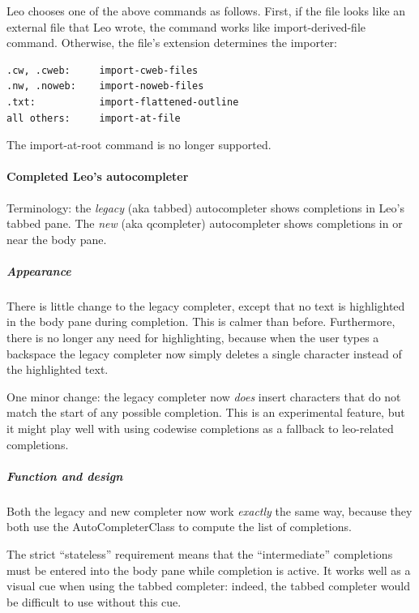 \documentclass[a4paper,10pt,english]{sphinxmanual}
\begin{document}
\begin{itemize}
Leo chooses one of the above commands as follows.  First, if the file looks
like an external file that Leo wrote, the command works like
import-derived-file command.  Otherwise, the file's extension determines the
importer:

\begin{Verbatim}[commandchars=\\\{\}]
.cw, .cweb:     import-cweb-files
.nw, .noweb:    import-noweb-files
.txt:           import-flattened-outline
all others:     import-at-file
\end{Verbatim}

The import-at-root command is no longer supported.

\end{itemize}


\paragraph{Completed Leo's autocompleter}
\label{what-is-new:completed-leo-s-autocompleter}
Terminology: the \emph{legacy} (aka tabbed) autocompleter shows completions in Leo's
tabbed pane. The \emph{new} (aka qcompleter) autocompleter shows completions in or
near the body pane.


\subparagraph{Appearance}
\label{what-is-new:appearance}
There is little change to the legacy completer, except that no text is
highlighted in the body pane during completion. This is calmer than before.
Furthermore, there is no longer any need for highlighting, because when the user
types a backspace the legacy completer now simply deletes a single character
instead of the highlighted text.

One minor change: the legacy completer now \emph{does} insert characters that do
not match the start of any possible completion. This is an experimental feature,
but it might play well with using codewise completions as a fallback to
leo-related completions.


\subparagraph{Function and design}
\label{what-is-new:function-and-design}
Both the legacy and new completer now work \emph{exactly} the same way, because they
both use the AutoCompleterClass to compute the list of completions.

The strict ``stateless'' requirement means that the ``intermediate'' completions
must be entered into the body pane while completion is active. It works well as
a visual cue when using the tabbed completer: indeed, the tabbed completer would
be difficult to use without this cue.
\end{document}
